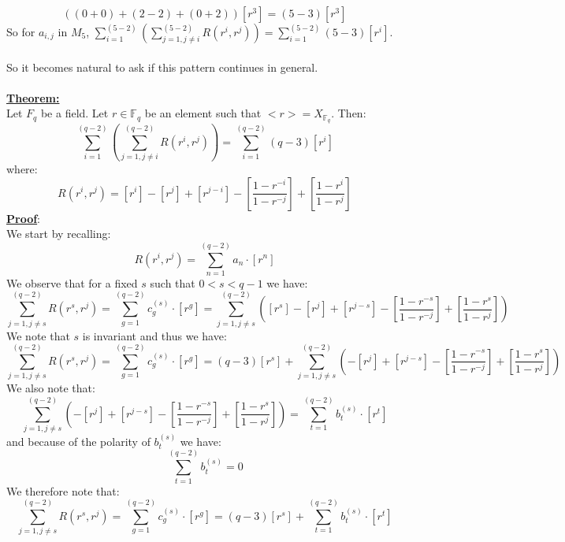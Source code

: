 \documentclass[11pt]{article}
\theoremstyle{plain}
\theoremstyle{definition}
\begin{document}
\begin{equation*}
((0+0) + (2 -2 ) + (0 +2))[r^3] = (5-3)[r^3]
\end{equation*}
So for $a_{i,j}$ in $M_5$, $\sum\limits_{i=1}^{(5-2)}( \sum\limits_{j=1, j \neq i}^{(5-2)} R(r^i,r^j) ) = \sum\limits_{i=1}^{(5-2)} (5-3)[r^i]$.\\
\\
So it becomes natural to ask if this pattern continues in general.\\
\\
\textbf{\underline{Theorem:}}\\
Let $F_q$ be a field. Let $r \in \mathbb{F}_q$ be an element such that  $<r> = X_{\mathbb{F}_q}$. Then:
\begin{equation}
\sum\limits_{i=1}^{(q-2)}( \sum\limits_{j=1, j \neq i}^{(q-2)} R(r^i,r^j) ) = \sum\limits_{i=1}^{(q-2)} (q-3)[r^i]
\end{equation}
where:
\begin{equation*}
R(r^{i},r^{j}) = [r^{i}] - [r^{j}] + [r^{j-i}] - [\frac{1-r^{-i}}{1-r^{-j}}] + [\frac{1-r^{i}}{1-r^{j}}]
\end{equation*}
\textbf{\underline{Proof}}:\\  
We start by recalling:
\begin{equation*}
R(r^{i}, r^{j}) = \sum\limits_{n=1}^{(q-2)} a_n \cdot [r^{n}]
\end{equation*}
We observe that for a fixed $s$ such that $0<s<q-1$ we have:\\
\begin{equation*}
\sum\limits_{j=1, j \neq s}^{(q-2)} R(r^s,r^j) = \sum\limits_{g=1}^{(q-2)} c_g ^ {(s)}\cdot [r^{g}] = \sum\limits_{j=1, j \neq s}^{(q-2)} ( [r^{s}] - [r^{j}] + [r^{j-s}] - [\frac{1-r^{-s}}{1-r^{-j}}] + [\frac{1-r^{s}}{1-r^{j}}])
\end{equation*}
We note that $s$ is invariant and thus we have:\\
\begin{equation*}
\sum\limits_{j=1, j \neq s}^{(q-2)} R(r^s,r^j) = \sum\limits_{g=1}^{(q-2)} c_g ^ {(s)} \cdot [r^{g}] = (q-3)[r^s] + \sum\limits_{j=1, j \neq s}^{(q-2)} (- [r^{j}] + [r^{j-s}] - [\frac{1-r^{-s}}{1-r^{-j}}] + [\frac{1-r^{s}}{1-r^{j}}])
\end{equation*}
We also note that:\\
\begin{equation*}
\sum\limits_{j=1, j \neq s}^{(q-2)} (-[r^{j}] + [r^{j-s}] - [\frac{1-r^{-s}}{1-r^{-j}}] + [\frac{1-r^{s}}{1-r^{j}}]) = \sum\limits_{t=1}^{(q-2)} b_{t} ^{(s)} \cdot [r^{t}]
\end{equation*}
and because of the polarity of $b_{t} ^{(s)}$ we have:\\
\begin{equation*}
\sum\limits_{t=1}^{(q-2)} b_{t} ^{(s)} = 0 
\end{equation*}
We therefore note that:\\
\begin{equation*}
 \sum\limits_{j=1, j \neq s}^{(q-2)} R(r^s,r^j) = \sum\limits_{g=1}^{(q-2)} c_g ^{(s)} \cdot [r^{g}] = (q-3)[r^s] + \sum\limits_{t=1}^{(q-2)} b_{t} ^{(s)} \cdot [r^{t}]
\end{equation*}
\end{document}
